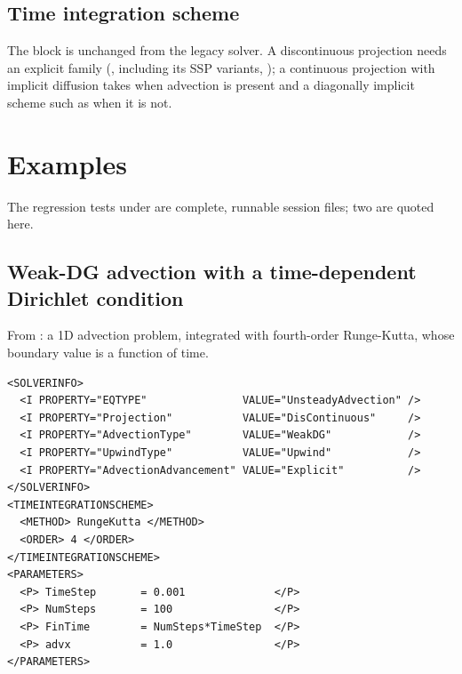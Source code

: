\subsection*{Time integration scheme}
The  block is unchanged from the legacy solver.
A discontinuous projection needs an explicit family (,
including its SSP variants, ); a continuous projection with
implicit diffusion takes  when advection is present and a
diagonally implicit scheme such as  when it is not.

\section{Examples}
The regression tests under  are
complete, runnable session files; two are quoted here.

\subsection*{Weak-DG advection with a time-dependent Dirichlet condition}
From : a 1D
advection problem, integrated with fourth-order Runge-Kutta, whose boundary
value is a function of time.
\begin{lstlisting}[style=XmlStyle]
<SOLVERINFO>
  <I PROPERTY="EQTYPE"               VALUE="UnsteadyAdvection" />
  <I PROPERTY="Projection"           VALUE="DisContinuous"     />
  <I PROPERTY="AdvectionType"        VALUE="WeakDG"            />
  <I PROPERTY="UpwindType"           VALUE="Upwind"            />
  <I PROPERTY="AdvectionAdvancement" VALUE="Explicit"          />
</SOLVERINFO>
<TIMEINTEGRATIONSCHEME>
  <METHOD> RungeKutta </METHOD>
  <ORDER> 4 </ORDER>
</TIMEINTEGRATIONSCHEME>
<PARAMETERS>
  <P> TimeStep       = 0.001              </P>
  <P> NumSteps       = 100                </P>
  <P> FinTime        = NumSteps*TimeStep  </P>
  <P> advx           = 1.0                </P>
</PARAMETERS>
\end{lstlisting}

